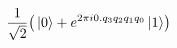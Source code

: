 \documentclass[preview]{standalone}
\begin{document}
\begin{align*}
\frac{1}{\sqrt{2}} \bigr( \ket{0} + e^{2\pi i 0.q_{3}q_{2}q_{1}q_{0} } \ket{1}\bigr)
\end{align*}
\end{document}
